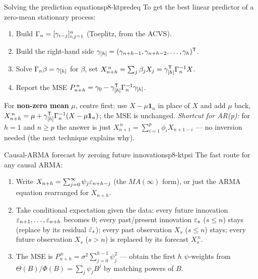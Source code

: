 \begin{keytech}{Solving the prediction equations}{p8-ktpredeq}
To get the best linear predictor of a zero-mean stationary process:
\begin{enumerate}
  \item Build $\Gamma_n=[\gamma_{i-j}]_{i,j=1}^n$ (Toeplitz, from the ACVS).
  \item Build the right-hand side
        $\gamma_{[h]}=(\gamma_{n+h-1},\gamma_{n+h-2},\dots,\gamma_h)^{\mathsf{T}}$.
  \item Solve $\Gamma_n\beta=\gamma_{[h]}$ for $\beta$, set
        $X^{\,n}_{n+h}=\sum_j\beta_jX_j=\gamma_{[h]}^{\mathsf{T}}\Gamma_n^{-1}X$.
  \item Report the MSE
        $P^{\,n}_{n+h}=\gamma_0-\gamma_{[h]}^{\mathsf{T}}\Gamma_n^{-1}\gamma_{[h]}$.
\end{enumerate}
For \textbf{non-zero mean} $\mu$, centre first: use $X-\mu\mathbf1_n$ in place of
$X$ and add $\mu$ back,
$X^{\,n}_{n+h}=\mu+\gamma_{[h]}^{\mathsf{T}}\Gamma_n^{-1}(X-\mu\mathbf1_n)$; the MSE is
unchanged. \emph{Shortcut for AR(p):} for $h=1$ and $n\ge p$ the answer is just
$X^{\,n}_{n+1}=\sum_{i=1}^p\phi_iX_{n+1-i}$ --- no inversion needed (the next
technique explains why).
\end{keytech}

\begin{keytech}{Causal-ARMA forecast by zeroing future innovations}{p8-ktpsi}
The fast route for any causal ARMA:
\begin{enumerate}
  \item Write $X_{n+h}=\sum_{j=0}^\infty\psi_j\varepsilon_{n+h-j}$ (the $MA(\infty)$
        form), or just the ARMA equation rearranged for $X_{n+h}$.
  \item Take conditional expectation given the data: every future innovation
        $\varepsilon_{n+1},\dots,\varepsilon_{n+h}$ becomes $0$; every past/present
        innovation $\varepsilon_s$ ($s\le n$) stays (replace by its residual
        $\hat{\varepsilon}_s$); every past observation $X_s$ ($s\le n$) stays; every
        future observation $X_s$ ($s>n$) is replaced by its forecast
        $X^{\,n}_s$.
  \item The MSE is $P^{\,n}_{n+h}=\sigma^2\sum_{j=0}^{h-1}\psi_j^2$ --- obtain the
        first $h$ $\psi$-weights from $\Theta(B)/\Phi(B)=\sum_j\psi_jB^j$ by
        matching powers of $B$.
\end{enumerate}
\end{keytech}


